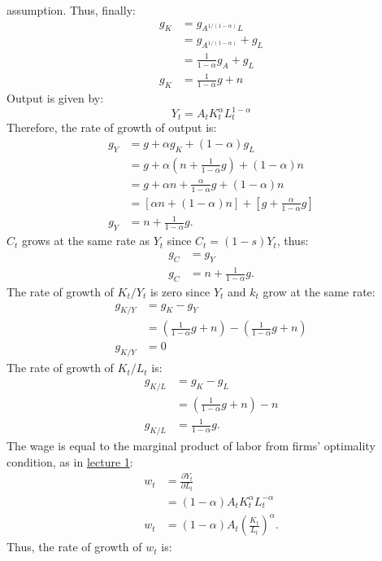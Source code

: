 \documentclass[]{book}
\theoremstyle{definition}
\theoremstyle{definition}
\theoremstyle{definition}
\theoremstyle{remark}
\begin{document}
\begin{enumerate}
  assumption. Thus, finally: \[
  \begin{aligned}
  g_K &=g_{A^{1/(1-\alpha)}L}\\
  &=g_{A^{1/(1-\alpha)}} + g_L\\
  &=\frac{1}{1-\alpha}g_A + g_L\\
  g_K &=\frac{1}{1-\alpha}g + n
  \end{aligned}
  \] Output is given by: \[Y_t=A_t K_t^{\alpha} L_t^{1-\alpha}\]
  Therefore, the rate of growth of output is: \[
  \begin{aligned}
  g_Y &= g + \alpha g_K +(1-\alpha)g_L\\
  &= g+ \alpha\left(n+\frac{1}{1-\alpha}g\right)+(1-\alpha)n\\
  &= g+ \alpha n+\frac{\alpha}{1-\alpha}g+(1-\alpha)n \\
  &= \left[\alpha n+(1-\alpha)n\right] + \left[g+  \frac{\alpha}{1-\alpha}g\right] \\
  g_Y&=n+\frac{1}{1-\alpha}g.
  \end{aligned}
  \] \(C_t\) grows at the same rate as \(Y_t\) since \(C_t=(1-s)Y_t\),
  thus: \[
  \begin{aligned}
  g_C&=g_Y \\
  g_C&=n+\frac{1}{1-\alpha}g.
  \end{aligned}
  \] The rate of growth of \(K_t/Y_t\) is zero since \(Y_t\) and \(k_t\)
  grow at the same rate: \[
  \begin{aligned}
  g_{K/Y}&=g_K-g_Y\\
  &=\left(\frac{1}{1-\alpha}g + n\right)-\left(\frac{1}{1-\alpha}g + n\right)\\
  g_{K/Y}&=0
  \end{aligned}
  \] The rate of growth of \(K_t/L_t\) is: \[
  \begin{aligned}
  g_{K/L}&=g_K-g_L\\
  &= \left(\frac{1}{1-\alpha}g + n\right)-n \\
  g_{K/L}&=\frac{1}{1-\alpha}g.
  \end{aligned}
  \] The wage is equal to the marginal product of labor from firms'
  optimality condition, as in \protect\hyperlink{intro-cobb}{lecture 1}:
  \[
  \begin{aligned}
  w_t&=\frac{\partial Y_t}{\partial L_t}\\
  &=(1-\alpha)A_t K_t^\alpha L_t^{-\alpha}\\
  w_t&=(1-\alpha)A_t \left(\frac{K_t}{L_t}\right)^{\alpha}.
  \end{aligned}
  \] Thus, the rate of growth of \(w_t\) is: \[
\]
\end{enumerate}
\end{document}
